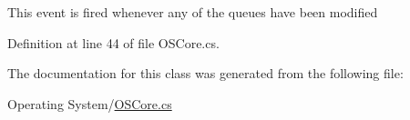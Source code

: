 This event is fired whenever any of the queues have been modified 



Definition at line 44 of file O\+S\+Core.\+cs.



The documentation for this class was generated from the following file\+:\begin{DoxyCompactItemize}
\item 
Operating System/\hyperlink{_o_s_core_8cs}{O\+S\+Core.\+cs}\end{DoxyCompactItemize}

